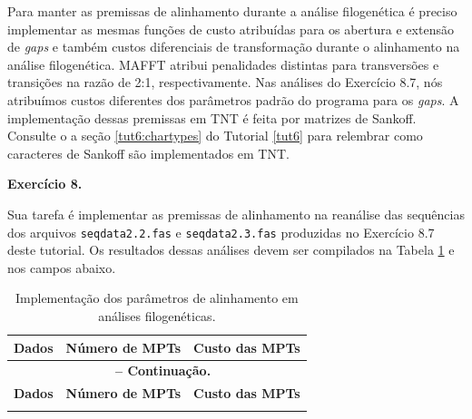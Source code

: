 \begin{refsection}
Para manter as premissas de alinhamento durante a análise filogenética é preciso implementar as mesmas funções de custo atribuídas para os abertura e extensão de \textit{gaps} e também custos diferenciais de transformação durante o alinhamento na análise filogenética. MAFFT atribui penalidades distintas para transversões e transições na razão de 2:1, respectivamente. Nas análises do Exercício 8.7, nós atribuímos custos diferentes dos parâmetros padrão do programa para os \textit{gaps}. A implementação dessas premissas em TNT é feita por matrizes de Sankoff. Consulte o a seção \ref{tut6:chartypes} do Tutorial \ref{tut6} para relembrar como caracteres de Sankoff são implementados em TNT.\\

\begin{blackBlock}{\textbf{Exercício 8.}}\label{tut8:ex:8.9}

Sua tarefa é implementar as premissas de alinhamento na reanálise das sequências dos arquivos \texttt{seqdata2.2.fas} e \texttt{seqdata2.3.fas} produzidas no Exercício 8.7 deste tutorial. Os resultados dessas análises devem ser compilados na Tabela \ref{tut8:table:implement} e nos campos abaixo.

\end{blackBlock}

\vspace{3cm}


\pagestyle{fancy}
\begin{center}

\begin{longtable}{|c|c|c|}
\caption[Implementação dos parâmetros de alinhamento em análises filogenéticas]{Implementação dos parâmetros de alinhamento em análises filogenéticas.} \label{tut8:table:implement} \\


\hline\hline \textbf{Dados} & \textbf{Número de MPTs}  & \textbf{Custo das MPTs}\\
\endfirsthead

\multicolumn{3}{c}{{\bfseries \tablename\ \thetable{} -- Continuação.}}\\
\hline\hline \textbf{Dados} & \textbf{Número de MPTs} & \textbf{Custo das MPTs}\\
\endhead
\hline \hline
\endlastfoot


\end{longtable}
\end{center}
\end{refsection}
